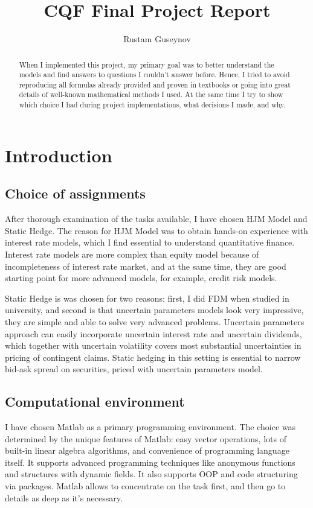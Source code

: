 \documentclass[11pt]{article} %
\title{CQF Final Project Report}
\author{Rustam Guseynov}
\begin{document}
\maketitle
\begin{abstract}
When I implemented this project, my primary goal was to better understand the models and find answers to questions I couldn't answer before. Hence, I tried to avoid reproducing all formulas already provided and proven in textbooks or going into great details of well-known mathematical methods I used. At the same time I try to show which choice I had during project implementations, what decisions I made, and why.
\end{abstract}

\section{Introduction}
\subsection{Choice of assignments}
After thorough examination of the tasks available, I have chosen HJM Model and Static Hedge. The reason for HJM Model was to obtain hands-on experience with interest rate models, which I find essential to understand quantitative finance. Interest rate models are more complex than equity model because of incompleteness of interest rate market, and at the same time, they are good starting point for more advanced models, for example, credit risk models.

Static Hedge is was chosen for two reasons: first, I did FDM when studied in university, and second is that uncertain parameters models look very impressive, they are simple and able to solve very advanced problems. Uncertain parameters approach can easily incorporate uncertain interest rate and uncertain dividends, which together with uncertain volatility covers most substantial uncertainties in pricing of contingent claims. Static hedging in this setting is essential to narrow bid-ask spread on securities, priced with uncertain parameters model.

\subsection{Computational environment}
I have chosen Matlab as a primary programming environment. The choice was determined by the unique features of Matlab: easy vector operations, lots of built-in linear algebra algorithms, and convenience of programming language itself. It supports advanced programming techniques like anonymous functions and structures with dynamic fields. It also supports OOP and code structuring via packages. Matlab allows to concentrate on the task first, and then go to details as deep as it's necessary.
\end{document}
